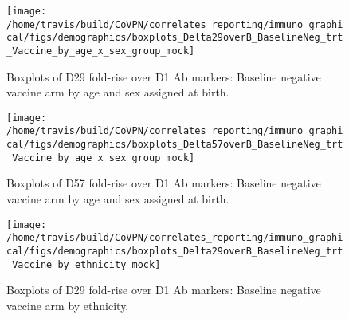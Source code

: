 \documentclass[]{book}
\theoremstyle{definition}
\theoremstyle{definition}
\theoremstyle{definition}
\newcommand{\1}{\mathbbm{1}}
\begin{document}
\clearpage

\clearpage

\clearpage

\clearpage

\clearpage

\clearpage

\clearpage

\clearpage

\clearpage

\clearpage

\clearpage

\clearpage

\clearpage

\clearpage

\clearpage

\clearpage

\clearpage

\clearpage
\begin{figure}[H]

{\centering \texttt{[image: /home/travis/build/CoVPN/correlates\_reporting/immuno\_graphical/figs/demographics/boxplots\_Delta29overB\_BaselineNeg\_trt\_Vaccine\_by\_age\_x\_sex\_group\_mock]} 

}

\caption{Boxplots of D29 fold-rise over D1 Ab markers: Baseline negative vaccine arm by age and sex assigned at birth.}\label{fig:unnamed-chunk-146}
\end{figure}

\clearpage
\begin{figure}[H]

{\centering \texttt{[image: /home/travis/build/CoVPN/correlates\_reporting/immuno\_graphical/figs/demographics/boxplots\_Delta57overB\_BaselineNeg\_trt\_Vaccine\_by\_age\_x\_sex\_group\_mock]} 

}

\caption{Boxplots of D57 fold-rise over D1 Ab markers: Baseline negative vaccine arm by age and sex assigned at birth.}\label{fig:unnamed-chunk-147}
\end{figure}

\clearpage

\clearpage

\clearpage
\begin{figure}[H]

{\centering \texttt{[image: /home/travis/build/CoVPN/correlates\_reporting/immuno\_graphical/figs/demographics/boxplots\_Delta29overB\_BaselineNeg\_trt\_Vaccine\_by\_ethnicity\_mock]} 

}

\caption{Boxplots of D29 fold-rise over D1 Ab markers: Baseline negative vaccine arm by ethnicity.}\label{fig:unnamed-chunk-150}
\end{figure}
\end{document}
